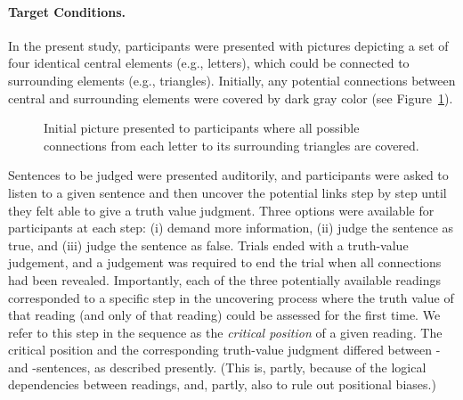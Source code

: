 \documentclass[fleqn,reqno,10pt,draft]{article}
\newcommand{\as}{\acro{as}}
\renewcommand{\es}{\acro{es}}
\begin{document}
\paragraph{Target Conditions.} In the present study, participants were
presented with pictures depicting a set of four identical central
elements (e.g., letters), which could be connected to surrounding
elements (e.g., triangles). Initially, any potential connections
between central and surrounding elements were covered by dark gray
color (see Figure~\ref{fig:InitialPicture}).
%
\begin{figure}
  \centering
      \caption{Initial picture presented to participants where all
        possible connections from each letter to its surrounding
        triangles are covered.}
  \label{fig:InitialPicture}
\end{figure}
%
Sentences to be judged 
were presented auditorily, and participants were asked to listen to a
given sentence and then uncover the potential links step by step until
they felt able to give a truth value judgment. Three options were
available for participants at each step: (i) demand more information,
(ii) judge the sentence as true, and (iii) judge the sentence as
false. Trials ended with a truth-value judgement, and a judgement was
required to end the trial when all connections had been
revealed. Importantly, each of the three potentially available
readings corresponded to a specific step in the uncovering process
where the truth value of that reading (and only of that reading) could
be assessed for the first time. We refer to this step in the sequence
as the {\it critical position} of a given reading. The critical
position and the corresponding truth-value judgment differed between
\as- and \es-sentences, as described presently. (This is, partly,
because of the logical dependencies between readings, and, partly,
also to rule out positional biases.)
\end{document}
